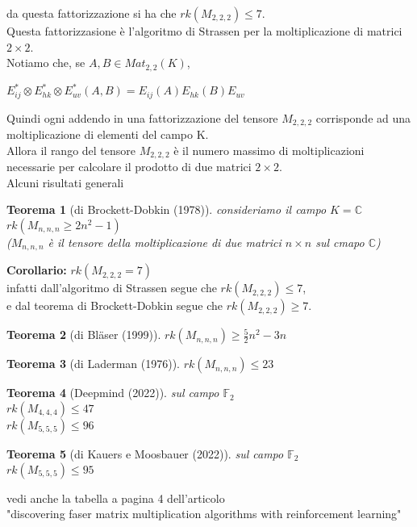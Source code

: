 \documentclass[a4paper,12pt]{article}
\theoremstyle{def}
\theoremstyle{prop}
\theoremstyle{esempio}
\theoremstyle{dimostrazione}
\theoremstyle{teo}
\newtheorem*{teorema}{Teorema}
\theoremstyle{osservazione}
\begin{document}
da questa fattorizzazione si ha che \(rk(M_{2,2,2}) \leq 7\).\\
Questa fattorizzasione è l'algoritmo di Strassen per la moltiplicazione di matrici \(2 \times 2\).\\
Notiamo che, se \(A,B \in Mat_{2,2}(K)\),
\begin{center}
	\(E_{ij}^* \otimes E_{hk}^* \otimes E_{uv}^* (A,B) = E_{ij}(A)E_{hk}(B)E_{uv}\)
\end{center}
Quindi ogni addendo in una fattorizzazione del tensore \(M_{2,2,2}\) corrisponde ad una moltiplicazione di elementi del campo K.\\
Allora il rango del tensore \(M_{2,2,2}\) è il numero massimo di moltiplicazioni necessarie per calcolare il prodotto di due matrici \(2 \times 2\).\\

\newpage
Alcuni risultati generali\\
\begin{teorema}[di Brockett-Dobkin (1978)]
	consideriamo il campo \(K = \mathbb{C}\)\\
	\(rk(M_{n,n,n} \geq 2n^2 -1)\)\\
	(\(M_{n,n,n}\) è il tensore della moltiplicazione di due matrici \(n \times n\) sul cmapo \(\mathbb{C}\))
\end{teorema}

\textbf{Corollario:} \(rk(M_{2,2,2} = 7)\)\\
infatti dall'algoritmo di Strassen segue che \(rk(M_{2,2,2}) \leq 7\),\\
e dal teorema di Brockett-Dobkin segue che \(rk(M_{2,2,2}) \geq 7\).\\

\begin{teorema}[di Bläser (1999)]
	\(rk(M_{n,n,n}) \geq \frac{5}{2}n^2 - 3n\)
\end{teorema}

\begin{teorema}[di Laderman (1976)]
	\(rk(M_{n,n,n}) \leq 23\)
\end{teorema}

\begin{teorema}[Deepmind (2022)]
	sul campo \(\mathbb{F}_2\)\\
	\(rk(M_{4,4,4}) \leq 47\)\\
	\(rk(M_{5,5,5}) \leq 96\)
\end{teorema}

\begin{teorema}[di Kauers e Moosbauer (2022)]
	sul campo \(\mathbb{F}_2\)\\
	\(rk(M_{5,5,5}) \leq 95\)\\
\end{teorema}
vedi anche la tabella a pagina 4 dell'articolo\\
"discovering faser matrix multiplication algorithms with reinforcement learning"\\
\end{document}
